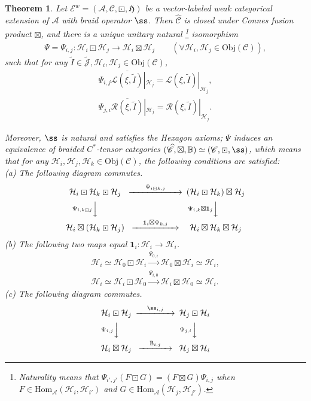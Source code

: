 \documentclass[11pt,b5paper,notitlepage]{article}
\theoremstyle{definition}
\theoremstyle{plain}
\newtheorem{thm}[df]{Theorem}
\newcommand{\fk}{\mathfrak}
\newcommand{\mc}{\mathcal}
\newcommand{\wtd}{\widetilde}
\newcommand{\wht}{\widehat}
\newcommand{\ovl}{\overline}
\newcommand{\id}{\mathbf{1}}
\newcommand{\Hom}{\mathrm{Hom}}
\newcommand{\scr}{\mathscr}
\newcommand{\Jtd}{\widetilde{\mathcal J}}
\newcommand{\mbb}{\mathbb}
\newcommand{\Obj}{\mathrm{Obj}}
\numberwithin{equation}{subsection}
\begin{document}
\begin{thm}\label{lb34}
Let $\scr E^w=(\mc A,\scr C,\boxdot,\fk H)$ be a vector-labeled weak categorical extension of $\mc A$ with braid operator $\ss$. Then $\wht{\scr C}$ is  closed under Connes fusion product $\boxtimes$, and there is a unique unitary natural \footnote{Naturality means that $\Psi_{i',j'}(F\boxdot G)=(F\boxtimes G)\Psi_{i,j}$ when $F\in\Hom_{\mc A}(\mc H_i,\mc H_{i'})$ and $G\in\Hom_{\mc A}(\mc H_j,\mc H_{j'})$.} isomorphism
\begin{align}
\Psi=\Psi_{i,j}:\mc H_i\boxdot\mc H_j\rightarrow\mc H_i\boxtimes\mc H_j\qquad(\forall \mc H_i,\mc H_j\in\Obj(\scr C)),
\end{align}
such that for any $\wtd I\in\Jtd,\mc H_i,\mc H_j\in\Obj(\scr C)$,
\begin{gather}
\Psi_{i,j}\ovl{\mc L(\xi,\wtd I)}|_{\mc H_j}=\scr L(\xi,\wtd I)|_{\mc H_j},\label{eq20}\\
\Psi_{j,i}\ovl{\mc R(\xi,\wtd I)}|_{\mc H_j}=\scr R(\xi,\wtd I)|_{\mc H_j}.\label{eq21}
\end{gather}

Moreover, $\ss$ is natural and satisfies the Hexagon axioms; $\Psi$ induces an equivalence of braided $C^*$-tensor categories $(\wht{\scr C},\boxtimes,\mathbb B)\simeq(\scr C,\boxdot,\ss)$, which means that for any $\mc H_i,\mc H_j,\mc H_k\in\Obj(\scr C)$, the following conditions are satisfied:\\
	(a) The following diagram commutes.
	\begin{gather}
	\begin{CD}
	\mc H_i\boxdot\mc H_k\boxdot\mc H_j @>~~\quad \Psi_{i\boxdot k,j} \quad~~>> (\mc H_i\boxdot \mc H_k)\boxtimes\mc H_j\\
	@V \Psi_{i,k\boxdot j} VV @V \Psi_{i,k}\boxtimes\id_j VV\\
	\mc H_i\boxtimes(\mc H_k\boxdot\mc H_j) @> \quad \id_i\boxtimes\Psi_{k,j} \quad>> \mc H_i\boxtimes\mc H_k\boxtimes\mc H_j
	\end{CD}\label{eq24}
	\end{gather}
	(b) The following two maps equal $\id_i:\mc H_i\rightarrow\mc H_i$.
	\begin{gather}
	\mc H_i\simeq \mc H_0\boxdot\mc H_i\xrightarrow{\Psi_{0,i}} \mc H_0\boxtimes\mc H_i\simeq\mc H_i,\\
	\mc H_i\simeq \mc H_i\boxdot\mc H_0\xrightarrow{\Psi_{i,0}} \mc H_i\boxtimes\mc H_0\simeq\mc H_i. 
	\end{gather}
	(c) The following diagram commutes.
	\begin{gather}
	\begin{CD}
	\mc H_i\boxdot\mc H_j @> \quad\ss_{i,j} \quad>> \mc H_j\boxdot\mc H_i\\
	@V \Psi_{i,j} VV @V \Psi_{j,i} VV\\
	\mc H_i\boxtimes\mc H_j @>\quad\mbb B_{i,j}\quad>> \mc H_j\boxtimes\mc H_i
	\end{CD}
	\end{gather}
\end{thm}
\end{document}
